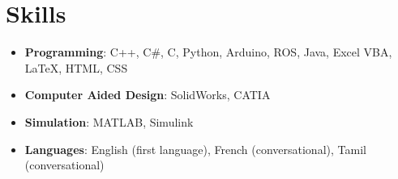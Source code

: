 \documentclass[letterpaper,11pt]{article}
\newcommand{\resumeSkillItemHeading}[2]{
  \item\small{
    \textbf{#1}{: #2 \vspace{-2pt}}
  }
}
\newcommand{\resumeSubHeadingListEnd}{\end{itemize}}
\newcommand{\resumeItemListStart}{\begin{itemize}}
\newcommand{\resumeItemListEnd}{\end{itemize}\vspace{-5pt}}
\begin{document}
			
			
			
	

\section{Skills}
\resumeItemListStart
  
  	\resumeSkillItemHeading
  		{Programming}
  		{C++, C\#, C, Python, Arduino, ROS, Java, Excel VBA, \LaTeX, HTML, CSS}
  	
  	\resumeSkillItemHeading
  		{Computer Aided Design}
  		{SolidWorks, CATIA}
  	
  	\resumeSkillItemHeading
  		{Simulation}
  		{MATLAB, Simulink}
  	
  	
  	\resumeSkillItemHeading
  		{Languages}
  		{English (first language), French (conversational), Tamil (conversational)}
  		
\resumeItemListEnd

\end{document}
